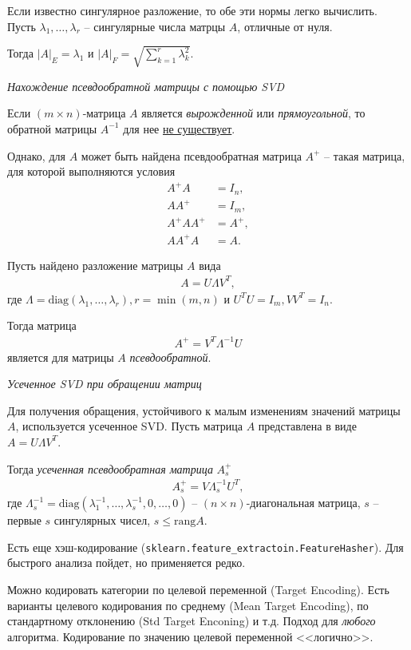\documentclass[%
	11pt,
	a4paper,
	utf8,
		]{article}
\begin{document}
Если известно сингулярное разложение, то обе эти нормы легко вычислить. Пусть $ \lambda_1, \ldots, \lambda_r $ -- сингулярные числа матрцы $ A $, отличные от нуля.

Тогда $ |A|_E = \lambda_1 $ и $ |A|_F = \sqrt{\sum\limits_{k=1}^{r} \lambda_k^2} $.

\noindent\emph{Нахождение псевдообратной матрицы с помощью SVD}

Если $ (m \times n) $-матрица $ A $ является \emph{вырожденной} или \emph{прямоугольной}, то обратной матрицы $ A^{-1} $ для нее \underline{не существует}. 

Однако, для $ A $ может быть найдена псевдообратная матрица $ A^{+} $ -- такая матрица, для которой выполняются условия
\begin{align*}
	A^{+}A &= I_n,\\
	A A^{+} &= I_m,\\
	A^{+} A A^{+} &= A^{+},\\
	A A^{+} A &= A.
\end{align*}

Пусть найдено разложение матрицы $ A $ вида
\begin{align*}
	A = U \Lambda V^T,
\end{align*}
где $ \Lambda = \text{diag}(\lambda_1, \ldots, \lambda_r), r=\min(m, n) $ и $ U^T U = I_m, VV^T = I_n $.

Тогда матрица
\begin{align*}
	A^+ = V^T \Lambda^{-1}U
\end{align*}
является для матрицы $ A $ \emph{псевдообратной}.

\noindent\emph{Усеченное SVD при обращении матриц}

Для получения обращения, устойчивого к малым изменениям значений матрицы $ A $, используется усеченное SVD. Пусть матрица $ A $ представлена в виде $ A = U\Lambda V^T $.

Тогда \emph{усеченная псевдообратная матрица} $ A_s^+ $
\begin{align*}
	A_s^+ = V \Lambda_s^{-1} U^T,
\end{align*}
где $ \Lambda_s^{-1} = \text{diag}(\lambda_1^{-1}, \ldots, \lambda_s^{-1}, 0, \ldots, 0) $ -- $ (n \times n) $-диагональная матрица, $ s $ -- первые $ s $ сингулярных чисел, $ s \leqslant \text{rang} A $.

Есть еще хэш-кодирование (\texttt{sklearn.feature\_extractoin.FeatureHasher}). Для быстрого анализа пойдет, но применяется редко.

Можно кодировать категории по целевой переменной (Target Encoding). Есть варианты целевого кодирования по среднему (Mean Target Encoding), по стандартному отклонению (Std Target Enconing) и т.д. Подход для \emph{любого} алгоритма. Кодирование по значению целевой переменной <<логично>>.
\end{document}
